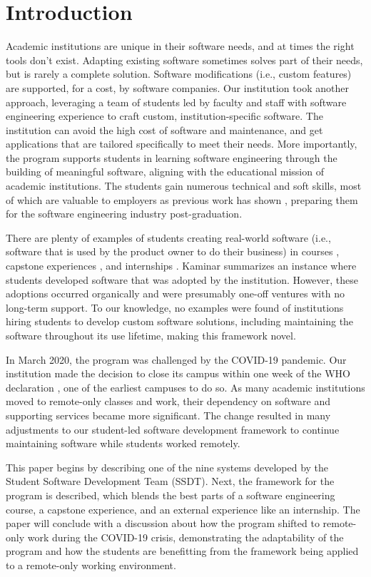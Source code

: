 \section{Introduction}

Academic institutions are unique in their software needs, and at times the right tools don't exist. Adapting existing software sometimes solves part of their needs, but is rarely a complete solution. Software modifications (i.e., custom features) are supported, for a cost, by software companies. Our institution took another approach, leveraging a team of students led by faculty and staff with software engineering experience to craft custom, institution-specific software. The institution can avoid the high cost of software and maintenance, and get applications that are tailored specifically to meet their needs. More importantly, the program supports students in learning software engineering through the building of meaningful software, aligning with the educational mission of academic institutions. The students gain numerous technical and soft skills, most of which are valuable to employers \cite{lavy2013soft} as previous work has shown \cite{heggen2018hiring}, preparing them for the software engineering industry post-graduation.

There are plenty of examples of students creating real-world software (i.e., software that is used by the product owner to do their business) in courses \cite{tadayon2004software}, capstone experiences \cite{capstone}, and internships \cite{rochesterfirstundergradsoftwareteam}. Kaminar \cite{kaminer_2014} summarizes an instance where students developed software that was adopted by the institution. However, these adoptions occurred organically and were presumably one-off ventures with no long-term support. To our knowledge, no examples were found of institutions hiring students to develop custom software solutions, including maintaining the software throughout its use lifetime, making this framework novel.

In March 2020, the program was challenged by the COVID-19 pandemic. Our institution made the decision to close its campus within one week of the WHO declaration \cite{covid}, one of the earliest campuses to do so. As many academic institutions moved to remote-only classes and work, their dependency on software and supporting services became more significant. The change resulted in many adjustments to our student-led software development framework to continue maintaining software while students worked remotely.

This paper begins by describing one of the nine systems developed by the Student Software Development Team (SSDT). Next, the framework for the program is described, which blends the best parts of a software engineering course, a capstone experience, and an external experience like an internship. The paper will conclude with a discussion about how the program shifted to remote-only work during the COVID-19 crisis, demonstrating the adaptability of the program and how the students are benefitting from the framework being applied to a remote-only working environment.
